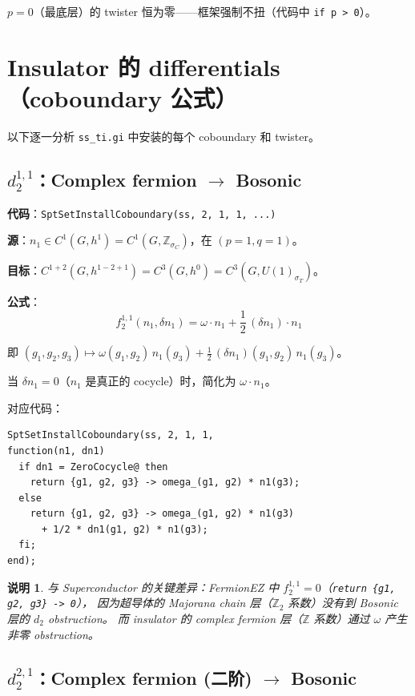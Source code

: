 \documentclass[a4paper,fontset=ubuntu,12pt]{ctexart}
\newtheorem{remark}[definition]{说明}
\newcommand{\ZZ}{\mathbb{Z}}
\newcommand{\aT}{\sigma_T}
\newcommand{\aC}{\sigma_C}
\begin{document}
$p = 0$（最底层）的 twister 恒为零——框架强制不扭（代码中 \texttt{if p > 0}）。

\section{Insulator 的 differentials（coboundary 公式）}
\label{sec:differentials}

以下逐一分析 \texttt{ss\_ti.gi} 中安装的每个 coboundary 和 twister。

\subsection{\texorpdfstring{$d_2^{1,1}$}{d2(1,1)}：Complex fermion $\to$ Bosonic}
\label{sec:d2-11}

\textbf{代码}：\texttt{SptSetInstallCoboundary(ss, 2, 1, 1, ...)}

\textbf{源}：$n_1 \in C^1(G, h^1) = C^1(G, \ZZ_{\aC})$，在 $(p = 1, q = 1)$。

\textbf{目标}：$C^{1+2}(G, h^{1-2+1}) = C^3(G, h^0) = C^3(G, U(1)_{\aT})$。

\textbf{公式}：
\begin{equation}
\label{eq:d2-11}
\boxed{f_2^{1,1}(n_1, \delta n_1) = \omega \cdot n_1 + \frac{1}{2}\, (\delta n_1) \cdot n_1}
\end{equation}

即 $(g_1, g_2, g_3) \mapsto \omega(g_1, g_2)\, n_1(g_3) + \frac{1}{2}\, (\delta n_1)(g_1, g_2)\, n_1(g_3)$。

当 $\delta n_1 = 0$（$n_1$ 是真正的 cocycle）时，简化为 $\omega \cdot n_1$。

对应代码：
\begin{lstlisting}
SptSetInstallCoboundary(ss, 2, 1, 1,
function(n1, dn1)
  if dn1 = ZeroCocycle@ then
    return {g1, g2, g3} -> omega_(g1, g2) * n1(g3);
  else
    return {g1, g2, g3} -> omega_(g1, g2) * n1(g3)
      + 1/2 * dn1(g1, g2) * n1(g3);
  fi;
end);
\end{lstlisting}

\begin{remark}
与 Superconductor 的关键差异：FermionEZ 中 $f_2^{1,1} = 0$（\texttt{return \{g1, g2, g3\} -> 0}），
因为超导体的 Majorana chain 层（$\ZZ_2$ 系数）没有到 Bosonic 层的 $d_2$ obstruction。
而 insulator 的 complex fermion 层（$\ZZ$ 系数）通过 $\omega$ 产生非零 obstruction。
\end{remark}

\subsection{\texorpdfstring{$d_2^{2,1}$}{d2(2,1)}：Complex fermion (二阶) $\to$ Bosonic}
\label{sec:d2-21}
\end{document}
